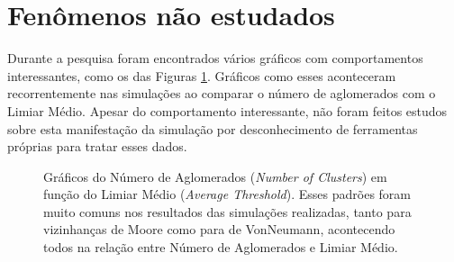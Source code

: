 \documentclass[
	12pt,				%
	openright,			%
	twoside,			%
	a4paper,			%
	english,			%
	french,				%
	spanish,			%
	brazil				%
	]{abntex2}
\begin{document}
\section{Fenômenos não estudados}

Durante a pesquisa foram encontrados vários gráficos com comportamentos interessantes, como os das Figuras \ref{fig:clusterthres}. Gráficos como esses aconteceram recorrentemente nas simulações ao comparar o número de aglomerados com o Limiar Médio. Apesar do comportamento interessante, não foram feitos estudos sobre esta manifestação da simulação por desconhecimento de ferramentas próprias para tratar esses dados.

\begin{figure}
  \centering

  \caption{Gráficos do Número de Aglomerados (\textit{Number of Clusters}) em função do Limiar Médio (\textit{Average Threshold}). Esses padrões foram muito comuns nos resultados das simulações realizadas, tanto para vizinhanças de Moore como para de VonNeumann, acontecendo todos na relação entre Número de Aglomerados e Limiar Médio.}
  \label{fig:clusterthres}
\end{figure}
\end{document}
